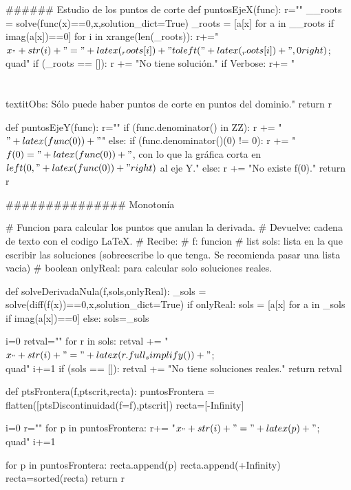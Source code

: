 \begin{sagesilent}
###### Estudio de los puntos de corte
def puntosEjeX(func):
    r=""
    __roots = solve(func(x)==0,x,solution_dict=True)
    _roots = [a[x] for a in __roots if imag(a[x])==0]
    for i in xrange(len(_roots)):
        r+="$x_"+str(i)+" = "+latex(_roots[i])+"\\to \\left("+latex(_roots[i])+",0\\right)$;\\quad"
    if (_roots == []):
        r += "No tiene solución."
    if Verbose:
        r+= "\\\\\\textit{Obs: Sólo puede haber puntos de corte en puntos del dominio.}"
    return r

def puntosEjeY(func):
    r=""
    if (func.denominator() in ZZ):
        r += "$" + latex(func(0)) +"$"
    else:
        if (func.denominator()(0) != 0):
            r += "$f(0) = " + latex(func(0)) + "$, con lo que la gráfica corta en $\\left(0,"+latex(func(0)) + "\\right)$ al eje Y."   
        else:
            r +=  "No existe f(0)."    
    return r


############### Monotonía

# Funcion para calcular los puntos que anulan la derivada.
# Devuelve: cadena de texto con el codigo LaTeX.
# Recibe:
#   f: funcion
#   list sols: lista en la que escribir las soluciones (sobreescribe lo que tenga. Se recomienda pasar una lista vacia) 
#   boolean onlyReal: para calcular solo soluciones reales.

def solveDerivadaNula(f,sols,onlyReal):
    _sols = solve(diff(f(x))==0,x,solution_dict=True)
    if onlyReal:
        sols = [a[x] for a in _sols if imag(a[x])==0]
    else: 
        sols=_sols

    i=0
    retval=""
    for r in sols:
        retval += "$x_"+str(i)+" = "+latex(r.full_simplify())+"$;\\quad"
        i+=1
    if (sols == []):
        retval += "No tiene soluciones reales."
    return retval


def ptsFrontera(f,ptscrit,recta):
    puntosFrontera = flatten([ptsDiscontinuidad(f=f),ptscrit])
    recta=[-Infinity]

    i=0
    r=""
    for p in puntosFrontera:
        r+= "$x_"+str(i)+"="+latex(p)+"$;\\quad"
        i+=1

    for p in puntosFrontera:
        recta.append(p)
    recta.append(+Infinity)
    recta=sorted(recta)
    return r


\end{sagesilent}

